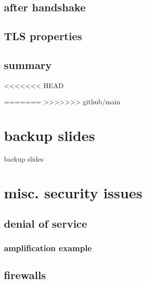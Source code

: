 \subsection{after handshake}


\subsection{TLS properties}

\subsection{summary}


<<<<<<< HEAD


=======
>>>>>>> github/main
\section{backup slides}
\begin{frame}{backup slides}
\end{frame}

\section{misc. security issues}

\subsection{denial of service}


\subsubsection{amplification example}

\subsection{firewalls} %





